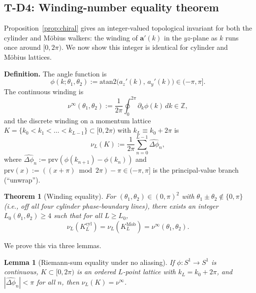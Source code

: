 \documentclass[aps,pra,reprint,amsmath,amssymb,superscriptaddress,nofootinbib,longbibliography]{revtex4-2}
\newcommand{\Z}{\mathbb{Z}}
\newcommand{\Mob}{\mathrm{M\ddot{o}b}}
\newcommand{\cyl}{\mathrm{cyl}}
\newcommand{\atantwo}{\mathrm{atan2}}
\newtheorem{theorem}{Theorem}
\newtheorem{lemma}{Lemma}
\begin{document}
\subsection{T-D4: Winding-number equality theorem}

Proposition~\ref{prop:chiral} gives an integer-valued topological invariant for both the cylinder and M\"obius walkers: the winding of $\mathbf{a}'(k)$ in the $yz$-plane as $k$ runs once around $[0, 2\pi)$. We now show this integer is identical for cylinder and M\"obius lattices.

\textbf{Definition.} The angle function is
\begin{equation}
\phi(k; \theta_1, \theta_2) := \atantwo\!\big(a_z'(k),\, a_y'(k)\big) \in (-\pi, \pi].
\end{equation}
The continuous winding is
\begin{equation}
\nu^\infty(\theta_1, \theta_2) := \frac{1}{2\pi} \oint_0^{2\pi} \partial_k \phi(k)\, dk \in \Z,
\end{equation}
and the discrete winding on a momentum lattice $K = \{k_0 < k_1 < \dots < k_{L-1}\} \subset [0, 2\pi)$ with $k_L \equiv k_0 + 2\pi$ is
\begin{equation}
\nu_L(K) := \frac{1}{2\pi} \sum_{n=0}^{L-1} \widehat{\Delta\phi}_n,
\end{equation}
where $\widehat{\Delta\phi}_n := \mathrm{prv}(\phi(k_{n+1}) - \phi(k_n))$ and $\mathrm{prv}(x) := ((x+\pi) \bmod 2\pi) - \pi \in (-\pi, \pi]$ is the principal-value branch (``unwrap'').

\begin{theorem}[Winding equality]
\label{thm:winding}
For $(\theta_1, \theta_2) \in (0, \pi)^2$ with $\theta_1 \pm \theta_2 \notin \{0, \pi\}$ (i.e., off all four cylinder phase-boundary lines), there exists an integer $L_0(\theta_1, \theta_2) \geq 4$ such that for all $L \geq L_0$,
\begin{equation}
\nu_L(K_L^\cyl) = \nu_L(K_L^\Mob) = \nu^\infty(\theta_1, \theta_2).
\end{equation}
\end{theorem}

We prove this via three lemmas.

\begin{lemma}[Riemann-sum equality under no aliasing]
\label{lem:noalias}
If $\phi : S^1 \to S^1$ is continuous, $K \subset [0, 2\pi)$ is an ordered $L$-point lattice with $k_L = k_0 + 2\pi$, and $|\widehat{\Delta\phi}_n| < \pi$ for all $n$, then $\nu_L(K) = \nu^\infty$.
\end{lemma}
\end{document}
